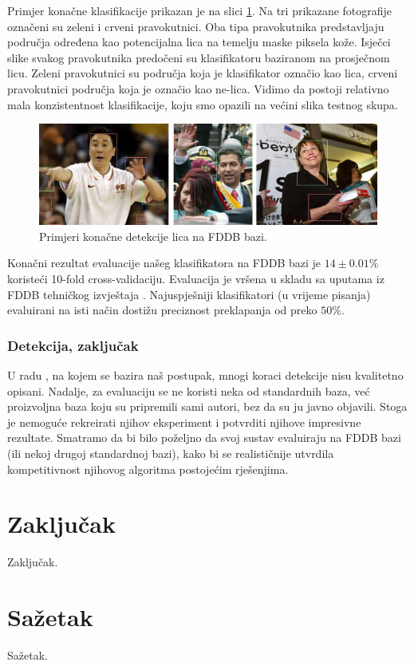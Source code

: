 \documentclass[times, utf8, seminar, numeric]{fer}
\begin{document}
Primjer konačne klasifikacije prikazan je na slici \ref{fig:fddb_bboxes}. Na tri prikazane fotografije
označeni su zeleni i crveni pravokutnici. Oba tipa pravokutnika predstavljaju područja određena
kao potencijalna lica na temelju maske piksela kože. Isječci slike svakog pravokutnika predočeni su
klasifikatoru baziranom na prosječnom licu. Zeleni pravokutnici su područja koja je klasifikator označio
kao lica, crveni pravokutnici područja koja je označio kao ne-lica. Vidimo da postoji relativno mala
konzistentnost klasifikacije, koju smo opazili na većini slika testnog skupa.

\begin{figure}[!htb]
\centering
\includegraphics[width=\textwidth]{raw/fddb_bboxes.jpg}
\caption{Primjeri konačne detekcije lica na FDDB bazi.}
\label{fig:fddb_bboxes}
\end{figure}

Konačni rezultat evaluacije našeg klasifikatora na FDDB bazi je $14 \pm 0.01\%$ koristeći
10-fold cross-validaciju. Evaluacija je vršena u skladu sa uputama iz FDDB tehničkog izvještaja
\cite{fddbTech}. Najuspješniji klasifikatori (u vrijeme pisanja) evaluirani na isti način
dostižu preciznost preklapanja od preko $50\%$.

\subsection{Detekcija, zaključak}

U radu \cite{conf/isda/ChandrappaR12}, na kojem se bazira naš postupak, mnogi koraci detekcije nisu kvalitetno
opisani. Nadalje, za evaluaciju se ne koristi neka od standardnih baza,
već proizvoljna baza koju su pripremili sami autori, bez da su ju javno objavili. Stoga je nemoguće
rekreirati njihov eksperiment i potvrditi njihove impresivne rezultate. Smatramo da bi bilo poželjno
da svoj sustav evaluiraju na FDDB bazi (ili nekoj drugoj standardnoj bazi), kako bi se realističnije
utvrdila kompetitivnost njihovog algoritma postojećim rješenjima.

\chapter{Zaključak}
Zaključak.




\chapter{Sažetak}
Sažetak.
\end{document}
